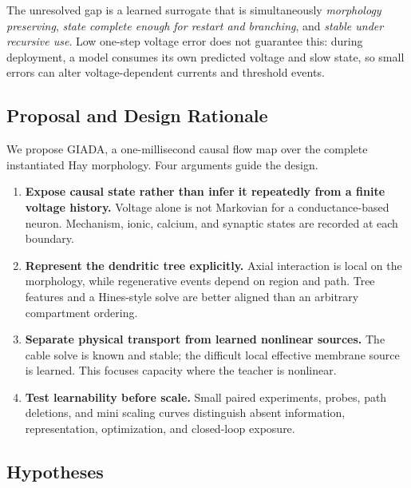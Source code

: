 \documentclass[11pt]{article}
\begin{document}
The unresolved gap is a learned surrogate that is simultaneously
\emph{morphology preserving}, \emph{state complete enough for restart and
branching}, and \emph{stable under recursive use}. Low one-step voltage error
does not guarantee this: during deployment, a model consumes its own predicted
voltage and slow state, so small errors can alter voltage-dependent currents
and threshold events.

\subsection{Proposal and Design Rationale}

We propose GIADA, a one-millisecond causal flow map over the complete
instantiated Hay morphology. Four arguments guide the design.
\begin{enumerate}
  \item \textbf{Expose causal state rather than infer it repeatedly from a
  finite voltage history.} Voltage alone is not Markovian for a
  conductance-based neuron. Mechanism, ionic, calcium, and synaptic states are
  recorded at each boundary.
  \item \textbf{Represent the dendritic tree explicitly.} Axial interaction is
  local on the morphology, while regenerative events depend on region and
  path. Tree features and a Hines-style solve are better aligned than an
  arbitrary compartment ordering.
  \item \textbf{Separate physical transport from learned nonlinear sources.}
  The cable solve is known and stable; the difficult local effective membrane
  source is learned. This focuses capacity where the teacher is nonlinear.
  \item \textbf{Test learnability before scale.} Small paired experiments,
  probes, path deletions, and mini scaling curves distinguish absent
  information, representation, optimization, and closed-loop exposure.
\end{enumerate}

\subsection{Hypotheses}
\end{document}
